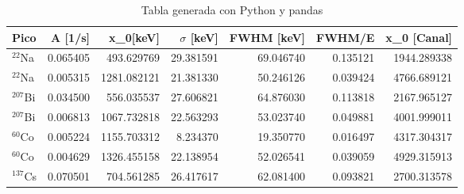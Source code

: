 \begin{table}
\caption{Tabla generada con Python y pandas}
\label{tab:datos}
\begin{tabular}{lrrrrrr}
\toprule
Pico & A [1/s] &  x_0[keV] &  $\sigma$ [keV] & FWHM [keV] & FWHM/E &  x_0 [Canal] \\
\midrule
$^{22}$Na & 0.065405 & 493.629769 & 29.381591 & 69.046740 & 0.135121 & 1944.289338 \\
$^{22}$Na & 0.005315 & 1281.082121 & 21.381330 & 50.246126 & 0.039424 & 4766.689121 \\
$^{207}$Bi & 0.034500 & 556.035537 & 27.606821 & 64.876030 & 0.113818 & 2167.965127 \\
$^{207}$Bi & 0.006813 & 1067.732818 & 22.563293 & 53.023740 & 0.049881 & 4001.999011 \\
$^{60}$Co & 0.005224 & 1155.703312 & 8.234370 & 19.350770 & 0.016497 & 4317.304317 \\
$^{60}$Co & 0.004629 & 1326.455158 & 22.138954 & 52.026541 & 0.039059 & 4929.315913 \\
$^{137}$Cs & 0.070501 & 704.561285 & 26.417617 & 62.081400 & 0.093821 & 2700.313578 \\
\bottomrule
\end{tabular}
\end{table}
